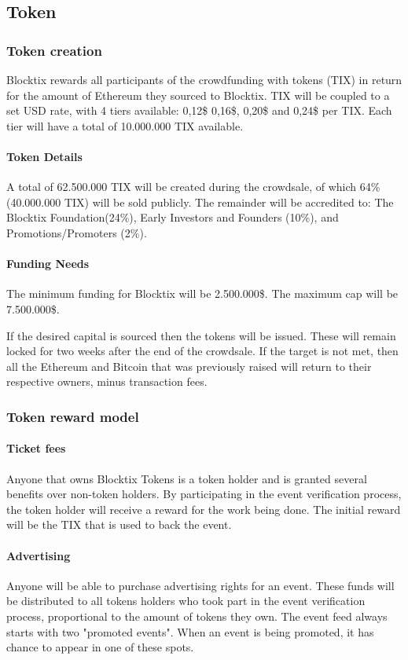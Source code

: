 \documentclass[a4paper]{article}
\begin{document}
\subsection{Token}
\subsubsection{Token creation}
Blocktix rewards all participants of the crowdfunding with tokens (TIX) in return for the amount of Ethereum they sourced to Blocktix. TIX will be coupled to a set USD rate, with 4 tiers available: 0,12\$ 0,16\$, 0,20\$ and 0,24\$ per TIX. Each tier will have a total of 10.000.000 TIX available. 

\paragraph{Token Details}
A total of 62.500.000 TIX will be created during the crowdsale, of which 64\% (40.000.000 TIX) will be sold publicly. The remainder will be accredited to: The Blocktix Foundation(24\%), Early Investors and Founders (10\%), and Promotions/Promoters (2\%).

\paragraph{Funding Needs}
The minimum funding for Blocktix will be 2.500.000\$. The maximum cap will be 7.500.000\$.

If the desired capital is sourced then the tokens will be issued. These will remain locked for two weeks after the end of the crowdsale. If the target is not met, then all the Ethereum and Bitcoin that was previously raised will return to their respective owners, minus transaction fees.

\subsubsection{Token reward model}
\paragraph{Ticket fees}
Anyone that owns Blocktix Tokens is a token holder and is granted several benefits over non-token holders.
By participating in the event verification process, the token holder will receive a reward for the work being done. The initial reward will be the TIX that is used to back the event.

\paragraph{Advertising}
Anyone will be able to purchase advertising rights for an event. These funds will be distributed to all tokens holders who took part in the event verification process, proportional to the amount of tokens they own. The event feed always starts with two "promoted events". When an event is being promoted, it has chance to appear in one of these spots.
\end{document}
